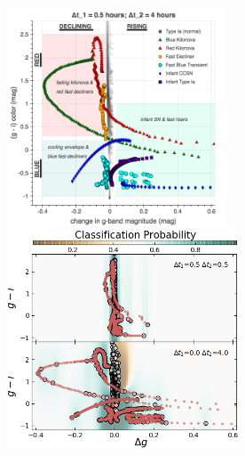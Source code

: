 \documentclass[12pt, letterpaper]{article}
\begin{document}
\begin{center}
\vspace{-0.5in}
\begin{figure}[!h]
\begin{center}
\includegraphics[height=6.5cm]{figures/LSST_PhaseSpace.png}
\includegraphics[height=6.5cm]{figures/FTclassifier.png}
    

\end{center}
\end{figure}
\end{center}
\end{document}
